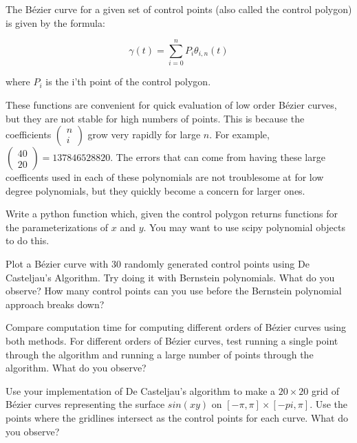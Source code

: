 The B\'{e}zier curve for a given set of control points (also called the control polygon) is given by the formula:

$$\gamma (t) = \sum_{i=0}^n P_i \theta_{i,n} (t)$$ 

where $P_i$ is the i'th point of the control polygon.

These functions are convenient for quick evaluation of low order B\'{e}zier curves, but they are not stable for high numbers of points. 
This is because the coefficients $\left( \begin{smallmatrix} n\\ i \end{smallmatrix} \right)$ grow very rapidly for large $n$. 
For example, $\left( \begin{smallmatrix} 40\\ 20 \end{smallmatrix} \right)=137846528820$. 
The errors that can come from having these large coefficents used in each of these polynomials are not troublesome at for low degree polynomials, but they quickly become a concern for larger ones. 

\begin{problem}
Write a python function which, given the control polygon returns functions for the parameterizations of $x$ and $y$. 
You may want to use scipy polynomial objects to do this.
\end{problem}

\begin{problem}
Plot a B\'{e}zier curve with 30 randomly generated control points using De Casteljau's Algorithm. 
Try doing it with Bernstein polynomials. 
What do you observe? 
How many control points can you use before the Bernstein polynomial approach breaks down?
\end{problem}

\begin{problem}
Compare computation time for computing different orders of B\'{e}zier curves using both methods. 
For different orders of B\'{e}zier curves, test running a single point through the algorithm and running a large number of points through the algorithm. 
What do you observe?
\end{problem}

\begin{problem}
Use your implementation of De Casteljau's algorithm to make a $20\times 20$ grid of B\'{e}zier curves representing the surface $sin(xy)$ on $[-\pi,\pi]\times [-pi,\pi]$.
Use the points where the gridlines intersect as the control points for each curve. 
What do you observe?
\end{problem}
